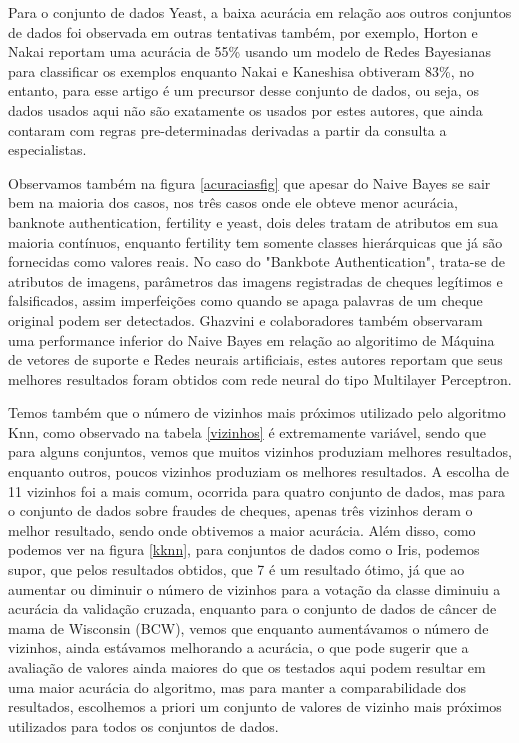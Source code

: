 \documentclass[12pt, a4paper]{article}
\begin{document}
\begin{table}[!ht]
\begin{tabular}{|l|l|l|l|}
\hline
\end{tabular}

\end{table}

Para o conjunto de dados Yeast, a baixa acurácia em relação aos outros conjuntos de dados foi observada em outras tentativas também, por exemplo, Horton e Nakai \citep{horton_kenta1996} reportam uma acurácia de 55\% usando um modelo de Redes Bayesianas para classificar os exemplos enquanto Nakai e Kaneshisa \citep{nakai_kaneshisa1991} obtiveram 83\%, no entanto, para esse artigo é um precursor desse conjunto de dados, ou seja, os dados usados aqui não são exatamente os usados por estes autores, que ainda contaram com regras pre-determinadas derivadas a partir da consulta a especialistas. 

Observamos também na figura \ref{acuraciasfig} que apesar do Naive Bayes se sair bem na maioria dos casos, nos três casos onde ele obteve menor acurácia, banknote authentication, fertility e yeast, dois deles tratam de atributos em sua maioria contínuos, enquanto fertility tem somente classes hierárquicas que já são fornecidas como valores reais. No caso do "Bankbote Authentication", trata-se de atributos de imagens, parâmetros das imagens registradas de cheques legítimos e falsificados, assim imperfeições como quando se apaga palavras de um cheque original podem ser detectados. Ghazvini e colaboradores \citep{ghazvini_etal2014} também observaram uma performance inferior do Naive Bayes em relação ao algoritimo de Máquina de vetores de suporte e Redes neurais artificiais, estes autores reportam que seus melhores resultados foram obtidos com rede neural do tipo Multilayer Perceptron.

Temos também que o número de vizinhos mais próximos utilizado pelo algoritmo Knn, como observado na tabela \ref{vizinhos} é extremamente variável, sendo que para alguns conjuntos, vemos que muitos vizinhos produziam melhores resultados, enquanto outros, poucos vizinhos produziam os melhores resultados. A escolha de 11 vizinhos foi a mais comum, ocorrida para quatro conjunto de dados, mas para o conjunto de dados sobre fraudes de cheques, apenas três vizinhos deram o melhor resultado, sendo onde obtivemos a maior acurácia. Além disso, como podemos ver na figura \ref{kknn}, para conjuntos de dados como o Iris, podemos supor, que pelos resultados obtidos, que 7 é um resultado ótimo, já que ao aumentar ou diminuir o número de vizinhos para a votação da classe diminuiu a acurácia da validação cruzada, enquanto para o conjunto de dados de câncer de mama de Wisconsin (BCW), vemos que enquanto aumentávamos o número de vizinhos, ainda estávamos melhorando a acurácia, o que pode sugerir que a avaliação de valores ainda maiores do que os testados aqui podem resultar em uma maior acurácia do algoritmo, mas para manter a comparabilidade dos resultados, escolhemos a priori um conjunto de valores de vizinho mais próximos utilizados para todos os conjuntos de dados.
\end{document}
